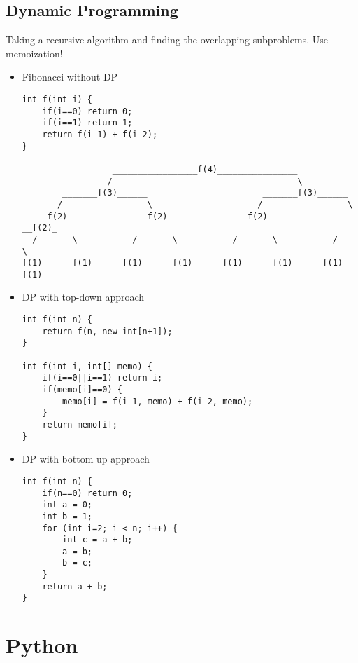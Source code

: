 \documentclass[a4paper, 11.25pt]{article}
\begin{document}
\subsection{Dynamic Programming}
Taking a recursive algorithm and finding the overlapping subproblems. Use memoization!
\begin{itemize}
    \item Fibonacci without DP
    \begin{lstlisting}[style=CStyle]
int f(int i) {
    if(i==0) return 0;
    if(i==1) return 1;
    return f(i-1) + f(i-2);
}

                  _________________f(4)________________
                 /                                     \
        _______f(3)______                       _______f(3)______
       /                 \                     /                 \
   __f(2)_             __f(2)_             __f(2)_             __f(2)_
  /       \           /       \           /       \           /       \
f(1)      f(1)      f(1)      f(1)      f(1)      f(1)      f(1)      f(1)\end{lstlisting}
    \item DP with top-down approach
    \begin{lstlisting}[style=CStyle]
int f(int n) {
    return f(n, new int[n+1]);
}

int f(int i, int[] memo) {
    if(i==0||i==1) return i;
    if(memo[i]==0) {
        memo[i] = f(i-1, memo) + f(i-2, memo);
    }
    return memo[i];
}\end{lstlisting}
    \item DP with bottom-up approach
    \begin{lstlisting}[style=CStyle]
int f(int n) {
    if(n==0) return 0;
    int a = 0;
    int b = 1;
    for (int i=2; i < n; i++) {
        int c = a + b;
        a = b;
        b = c;
    }
    return a + b;
}\end{lstlisting}   
\end{itemize}

\clearpage
\section{Python}
\end{document}
